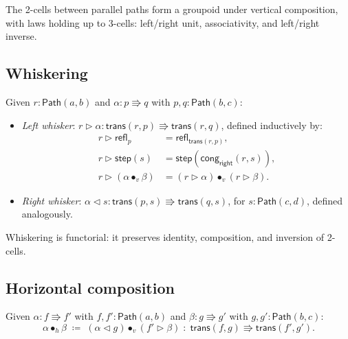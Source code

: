 \documentclass[manuscript]{BSLstyle}
\newcommand{\Path}{\mathsf{Path}}
\newcommand{\refl}{\mathsf{refl}}
\newcommand{\trans}{\mathsf{trans}}
\newcommand{\defeq}{\coloneqq}
\begin{document}
\begin{proposition}\label{prop:vert-groupoid}
The 2-cells between parallel paths form a groupoid under vertical
composition, with laws holding up to 3-cells:
left/right unit, associativity, and left/right inverse.
\end{proposition}

\subsection{Whiskering}

\begin{definition}\label{def:whiskering}
Given $r : \Path(a, b)$ and $\alpha : p \Rrightarrow q$ with
$p, q : \Path(b, c)$:
\begin{itemize}
\item \emph{Left whisker}: $r \triangleright \alpha :
  \trans(r, p) \Rrightarrow \trans(r, q)$, defined inductively by:
  \begin{align*}
  r \triangleright \refl_p &= \refl_{\trans(r, p)}, \\
  r \triangleright \mathsf{step}(s) &= \mathsf{step}(\mathsf{cong}_{\mathsf{right}}(r, s)), \\
  r \triangleright (\alpha \bullet_v \beta) &= (r \triangleright \alpha) \bullet_v (r \triangleright \beta).
  \end{align*}
\item \emph{Right whisker}: $\alpha \triangleleft s :
  \trans(p, s) \Rrightarrow \trans(q, s)$, for $s : \Path(c, d)$,
  defined analogously.
\end{itemize}
\end{definition}

Whiskering is functorial: it preserves identity, composition, and
inversion of 2-cells.

\subsection{Horizontal composition}

\begin{definition}\label{def:hcomp}
Given $\alpha : f \Rrightarrow f'$ with $f, f' : \Path(a, b)$ and
$\beta : g \Rrightarrow g'$ with $g, g' : \Path(b, c)$:
\[
\alpha \bullet_h \beta \;\defeq\;
(\alpha \triangleleft g) \bullet_v (f' \triangleright \beta)
\;:\; \trans(f, g) \Rrightarrow \trans(f', g').
\]
\end{definition}
\end{document}
